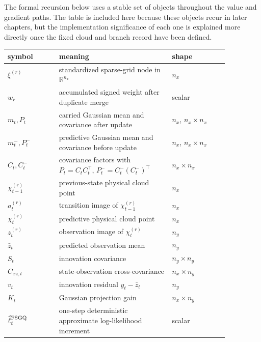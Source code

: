 \documentclass[11pt]{article}
\numberwithin{equation}{section}
\newcommand{\R}{\mathbb R}
\newcommand{\ellhat}{\widehat\ell}
\begin{document}
The formal recursion below uses a stable set of objects throughout the value and
gradient paths.  The table is included here because these objects recur in later
chapters, but the implementation significance of each one is explained more
directly once the fixed cloud and branch record have been defined.
\begin{center}
\small
\begin{tabular}{p{0.20\linewidth}p{0.44\linewidth}p{0.22\linewidth}}
\toprule
symbol & meaning & shape \\
\midrule
\(\xi^{(r)}\) & standardized sparse-grid node in \(\R^{n_x}\) & \(n_x\) \\
\(w_r\) & accumulated signed weight after duplicate merge & scalar \\
\(m_t,P_t\) & carried Gaussian mean and covariance after update & \(n_x\), \(n_x\times n_x\) \\
\(m_t^-,P_t^-\) & predictive Gaussian mean and covariance before update & \(n_x\), \(n_x\times n_x\) \\
\(C_t, C_t^-\) & covariance factors with \(P_t=C_tC_t^\top\), \(P_t^-=C_t^-(C_t^-)^\top\) & \(n_x\times n_x\) \\
\(\chi_{t-1}^{(r)}\) & previous-state physical cloud point & \(n_x\) \\
\(a_t^{(r)}\) & transition image of \(\chi_{t-1}^{(r)}\) & \(n_x\) \\
\(\chi_t^{(r)}\) & predictive physical cloud point & \(n_x\) \\
\(z_t^{(r)}\) & observation image of \(\chi_t^{(r)}\) & \(n_y\) \\
\(\bar z_t\) & predicted observation mean & \(n_y\) \\
\(S_t\) & innovation covariance & \(n_y\times n_y\) \\
\(C_{xz,t}\) & state-observation cross-covariance & \(n_x\times n_y\) \\
\(v_t\) & innovation residual \(y_t-\bar z_t\) & \(n_y\) \\
\(K_t\) & Gaussian projection gain & \(n_x\times n_y\) \\
\(\ellhat_t^{\rm FSGQ}\) & one-step deterministic approximate log-likelihood increment & scalar \\
\bottomrule
\end{tabular}
\end{center}
\end{document}
